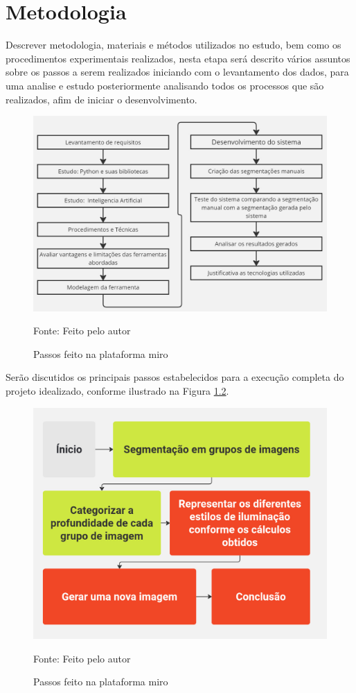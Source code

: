 \chapter{Metodologia}
\label{cap:03}

Descrever metodologia, materiais e métodos utilizados no estudo, bem como os procedimentos experimentais realizados, nesta etapa será descrito vários assuntos sobre os passos a serem realizados iniciando com o levantamento dos dados, para uma analise e estudo posteriormente analisando todos os processos que são realizados, afim de iniciar o desenvolvimento.


\begin{figure}[ht]
    \caption{Passos feito na plataforma miro}
    \centering
    \includegraphics[scale=0.2]{imagens/Diagrama.jpg}

    Fonte: Feito pelo autor
    \label{fig:diagrama}
\end{figure}

Serão discutidos os principais passos estabelecidos para a execução completa do projeto idealizado, conforme ilustrado na Figura \ref{fig:desenvolvimento}.

\begin{figure}[ht]
    \caption{Passos feito na plataforma miro}
    \centering
    \includegraphics[scale=0.2]{imagens/progresso_desenvolvimento.jpg}

    Fonte: Feito pelo autor
    \label{fig:desenvolvimento}
\end{figure}

